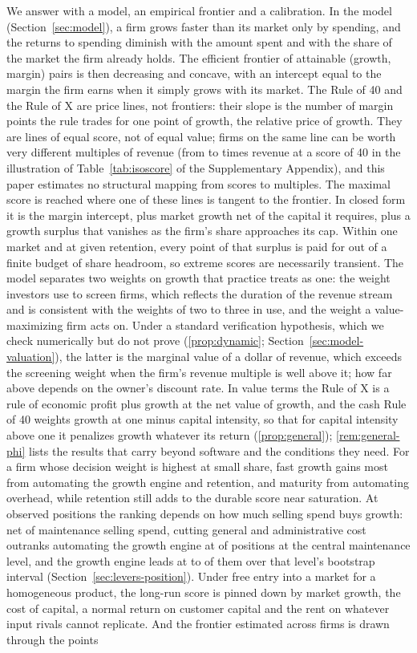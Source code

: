 We answer with a model, an empirical frontier and a calibration. In the model (Section~\ref{sec:model}), a firm grows faster than its market only by spending, and the returns to spending diminish with the amount spent and with the share of the market the firm already holds. The efficient frontier of attainable (growth, margin) pairs is then decreasing and concave, with an intercept equal to the margin the firm earns when it simply grows with its market. The Rule of 40 and the Rule of X are price lines, not frontiers: their slope is the number of margin points the rule trades for one point of growth, the relative price of growth. They are lines of equal score, not of equal value; firms on the same line can be worth very different multiples of revenue (from \IsoZero{} to \IsoThirty{} times revenue at a score of 40 in the illustration of Table~\ref{tab:isoscore} of the Supplementary Appendix), and this paper estimates no structural mapping from scores to multiples. The maximal score is reached where one of these lines is tangent to the frontier. In closed form it is the margin intercept, plus market growth net of the capital it requires, plus a growth surplus that vanishes as the firm's share approaches its cap. Within one market and at given retention, every point of that surplus is paid for out of a finite budget of share headroom, so extreme scores are necessarily transient. The model separates two weights on growth that practice treats as one: the weight investors use to screen firms, which reflects the duration of the revenue stream and is consistent with the weights of two to three in use, and the weight a value-maximizing firm acts on. Under a standard verification hypothesis, which we check numerically but do not prove (\autoref{prop:dynamic}; Section~\ref{sec:model-valuation}), the latter is the marginal value of a dollar of revenue, which exceeds the screening weight when the firm's revenue multiple is well above it; how far above depends on the owner's discount rate. In value terms the Rule of X is a rule of economic profit plus growth at the net value of growth, and the cash Rule of 40 weights growth at one minus capital intensity, so that for capital intensity above one it penalizes growth whatever its return (\autoref{prop:general}); \autoref{rem:general-phi} lists the results that carry beyond software and the conditions they need. For a firm whose decision weight is highest at small share, fast growth gains most from automating the growth engine and retention, and maturity from automating overhead, while retention still adds to the durable score near saturation. At observed positions the ranking depends on how much selling spend buys growth: net of maintenance selling spend, cutting general and administrative cost outranks automating the growth engine at \lpNGACutFirstNet{} of \lpNPositions{} positions at the central maintenance level, and the growth engine leads at \StLeverMin{} to \StLeverMax{} of them over that level's bootstrap interval (Section~\ref{sec:levers-position}). Under free entry into a market for a homogeneous product, the long-run score is pinned down by market growth, the cost of capital, a normal return on customer capital and the rent on whatever input rivals cannot replicate. And the frontier estimated across firms is drawn through the points 